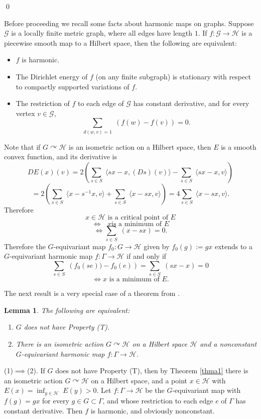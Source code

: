\documentclass[12pt]{amsart}
\numberwithin{equation}{section}
\theoremstyle{plain}
\newtheorem{lemma}[equation]{Lemma}
\theoremstyle{remark}
\theoremstyle{definition}
\newcommand{\ra}{\rightarrow}
\newcommand{\G}{{\mathcal G}}
\newcommand{\h}{{\mathcal H}}
\newcommand{\acts}{\curvearrowright}
\def\Ga{\Gamma}
\def\ra{\rightarrow}
\def\defeq{:=}
\begin{document}
\qed



\bigskip
\bigskip
Before proceeding we recall some facts about harmonic
maps on graphs.   Suppose $\G$ is a locally finite metric
graph, where all edges have length $1$.   If
$f:\G\ra \h$ is a piecewise
smooth map to a Hilbert space, then the following
are equivalent:

\begin{itemize}
\item $f$ is harmonic.
\item The Dirichlet energy of $f$ (on any finite subgraph)
is stationary with respect to compactly supported variations
of $f$.
\item The restriction of $f$ to each edge of $\G$
has constant derivative, and for every vertex $v\in \G$, 
$$
\sum_{d(w,v)=1}\;\left(f(w)-f(v)\right)=0.
$$ 
\end{itemize}

 
Note that if $G\acts \h$ is an isometric action on a Hilbert
space, then $E$ is a smooth convex function,  and its derivative
is
$$
DE(x)(v)=2\left(\sum_{s\in S}\;\langle s x-x,(Ds)( v)\rangle
-\sum_{s\in S}\;\langle s x-x,v\rangle\right)
$$
$$
=2\left(\sum_{s\in S}\;\langle x-s^{-1}x,v\rangle
+\sum_{s\in S}\;\langle x-s x,v\rangle\right)
=4\sum_{s\in S}\;\langle x-s x,v\rangle.
$$
Therefore  
$$
\mbox{$x\in\h$ is a critical point of $E$}
$$
$$
\Longleftrightarrow\mbox{ $x$
is a minimum of $E$}
$$
\begin{equation}
\label{eqncriticalpoint}
\Longleftrightarrow
\sum_{s\in S}\;(x-s x)=0.
\end{equation}
Therefore the $G$-equivariant map $f_0:G\ra \h$
given by $f_0(g)\defeq gx$ extends to a $G$-equivariant
harmonic  map $f:\Ga\ra\h$ if and only if
$$
\sum_{s\in S}\;\left(f_0(s e))-f_0(e)\right)
=\sum_{s\in S}\;\left(s x-x\right)=0
$$
$$
\Longleftrightarrow\mbox{$x$ is a minimum of $E$.}
$$


\bigskip
The next result is a very special case of a theorem
from \cite{mok,korevaarschoen}.
\begin{lemma}
The following are equivalent:
\begin{enumerate}
\item
$G$ does not have Property (T).
\item There is an isometric
action $G\acts \h$ on a Hilbert space $\h$ and a
nonconstant $G$-equivariant harmonic map $f:\Ga\ra\h$.
\end{enumerate}
\end{lemma}
\proof
(1)$\implies$(2).  If $G$ does not have Property (T), then
by Theorem \ref{thma1} there is an isometric action 
$G\acts \h$ on a Hilbert space,  and a point $x\in \h$ with 
$E(x)=\inf_{y\in \h}\;E(y)>0$.  Let $f:\Ga\ra \h$ be the
 $G$-equivariant map with $f(g)=gx$ for every $g\in G\subset\Ga$, 
and whose
restriction to each edge $e$ of $\Ga$ has constant derivative.
Then $f$ is harmonic,
and obviously nonconstant.
\end{document}
